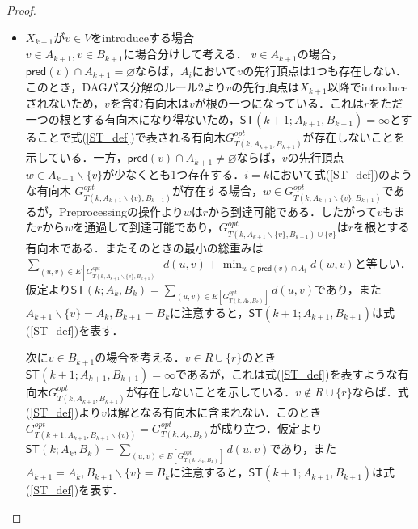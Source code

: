 \documentclass[master]{kuisthesis}		%
\theoremstyle{plain}
\theoremstyle{definition}
\begin{document}
{\begin{proof}
    
    \begin{itemize}
        \item $X_{k+1}$が$v \in V$をintroduceする場合 \\
        $v \in A_{k+1}, v \in B_{k+1}$に場合分けして考える．
        $v \in A_{k+1}$の場合，$\mathsf{pred}(v) \cap A_{k+1} = \varnothing$ならば，$A_i$において$v$の先行頂点は1つも存在しない．このとき，DAGパス分解のルール2より$v$の先行頂点は$X_{k+1}$以降でintroduceされないため，$v$を含む有向木は$v$が根の一つになっている．これは$r$をただ一つの根とする有向木になり得ないため，$\mathsf{ST}(k+1; A_{k+1}, B_{k+1}) = \infty$とすることで式(\ref{ST_def})で表される有向木$G^{opt}_{T(k, A_{k+1}, B_{k+1})}$が存在しないことを示している．一方，$\mathsf{pred}(v) \cap A_{k+1} \neq \varnothing$ならば，$v$の先行頂点$w \in A_{k+1} \backslash \{v\}$が少なくとも1つ存在する．$i=k$において式(\ref{ST_def})のような有向木 $G^{opt}_{T(k, A_{k+1} \backslash \{v\}, B_{k+1})}$が存在する場合，$w \in G^{opt}_{T(k,A_{k+1} \backslash \{v\}, B_{k+1})}$であるが，Preprocessingの操作より$w$は$r$から到達可能である．したがって$v$もまた$r$から$w$を通過して到達可能であり，$G^{opt}_{T(k, A_{k+1} \backslash \{v\}, B_{k+1}) \cup \{v\}}$は$r$を根とする有向木である．またそのときの最小の総重みは$ \sum_{(u, v) \in E[G^{opt}_{T(k, A_{k+1} \backslash \{v\}, B_{k+1})}]} d(u, v) + \displaystyle \min_{w \in \mathsf{pred}(v) \cap A_i} d(w, v)$と等しい．仮定より$\mathsf{ST}(k; A_k, B_k) =  \sum_{(u, v) \in E[G^{opt}_{T(k, A_k, B_k)}]} d(u, v)$であり，また$A_{k+1} \backslash \{v\} = A_k, B_{k+1} = B_k$に注意すると，$\mathsf{ST}(k+1; A_{k+1}, B_{k+1})$は式(\ref{ST_def})を表す．

        次に$v \in B_{k+1}$の場合を考える．$v \in R \cup \{r\}$のとき$\mathsf{ST}(k+1; A_{k+1}, B_{k+1}) = \infty$であるが，これは式(\ref{ST_def})を表すような有向木$G^{opt}_{T(k, A_{k+1}, B_{k+1})}$が存在しないことを示している．$v \notin R \cup \{r\}$ならば．式(\ref{ST_def})より$v$は解となる有向木に含まれない．このとき$G^{opt}_{T(k+1, A_{k+1}, B_{k+1} \backslash \{v\})} = G^{opt}_{T(k, A_k, B_k)}$が成り立つ．仮定より$\mathsf{ST}(k; A_k, B_k) = \sum_{(u, v) \in E[G^{opt}_{T(k, A_k, B_k)}]} d(u, v)$であり，また$A_{k+1} = A_k, B_{k+1} \backslash \{v\} = B_k$に注意すると，$\mathsf{ST}(k+1; A_{k+1}, B_{k+1})$は式(\ref{ST_def})を表す．
        

\end{itemize}
\end{proof}}
\end{document}
